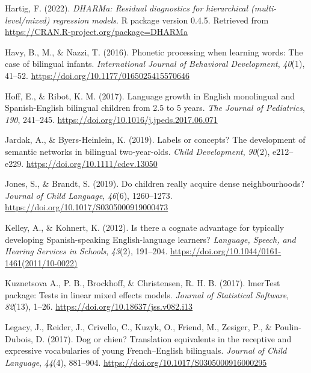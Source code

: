 \documentclass[
  ,man,floatsintext]{apa6}
\newlength{\cslhangindent}
\newlength{\cslentryspacingunit} %
\newenvironment{CSLReferences}[2] %
 {%
  \setlength{\parindent}{0pt}
  \ifodd #1
  \let\oldpar\par
  \def\par{\hangindent=\cslhangindent\oldpar}
  \fi
  \setlength{\parskip}{#2\cslentryspacingunit}
 }%
 {}
\begin{document}
\begin{CSLReferences}{1}{0}
\leavevmode{}%
Hartig, F. (2022). \emph{DHARMa: Residual diagnostics for hierarchical (multi-level/mixed) regression models}. R package version 0.4.5. Retrieved from \url{https://CRAN.R-project.org/package=DHARMa}

\leavevmode{}%
Havy, B., M., \& Nazzi, T. (2016). Phonetic processing when learning words: The case of bilingual infants. \emph{International Journal of Behavioral Development}, \emph{40}(1), 41--52. \url{https://doi.org/10.1177/0165025415570646}

\leavevmode{}%
Hoff, E., \& Ribot, K. M. (2017). Language growth in {E}nglish monolingual and {S}panish-{E}nglish bilingual children from 2.5 to 5 years. \emph{The Journal of Pediatrics}, \emph{190}, 241--245. \url{https://doi.org/10.1016/j.jpeds.2017.06.071}

\leavevmode{}%
Jardak, A., \& Byers-Heinlein, K. (2019). Labels or concepts? The development of semantic networks in bilingual two-year-olds. \emph{Child Development}, \emph{90}(2), e212--e229. \url{https://doi.org/10.1111/cdev.13050}

\leavevmode{}%
Jones, S., \& Brandt, S. (2019). Do children really acquire dense neighbourhoods? \emph{Journal of Child Language}, \emph{46}(6), 1260--1273. \url{https://doi.org/10.1017/S0305000919000473}

\leavevmode{}%
Kelley, A., \& Kohnert, K. (2012). Is there a cognate advantage for typically developing {S}panish-speaking {E}nglish-language learners? \emph{Language, Speech, and Hearing Services in Schools}, \emph{43}(2), 191--204. \url{https://doi.org/10.1044/0161-1461(2011/10-0022)}

\leavevmode{}%
Kuznetsova A., P. B., Brockhoff, \& Christensen, R. H. B. (2017). lmerTest package: Tests in linear mixed effects models. \emph{Journal of Statistical Software}, \emph{82}(13), 1--26. \url{https://doi.org/10.18637/jss.v082.i13}

\leavevmode{}%
Legacy, J., Reider, J., Crivello, C., Kuzyk, O., Friend, M., Zesiger, P., \& Poulin-Dubois, D. (2017). Dog or chien? Translation equivalents in the receptive and expressive vocabularies of young {F}rench--{E}nglish bilinguals. \emph{Journal of Child Language}, \emph{44}(4), 881--904. \url{https://doi.org/10.1017/S0305000916000295}


\end{CSLReferences}
\end{document}

